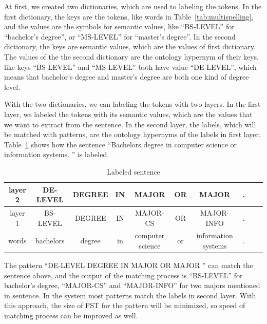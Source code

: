 At first, we created two dictionaries, which are used to labeling the tokens. In the first dictionary, the keys are the tokens, like words in Table~\ref{tab:multispelling}, and the values are the symbols for semantic values, like ``BS-LEVEL'' for ``bachelor's degree'', or ``MS-LEVEL'' for ``master's degree''. In the second dictionary, the keys are semantic values, which are the values of first dictionary. The values of the the second dictionary are the ontology hypernym of their keys, like keys ``BS-LEVEL'' and  ``MS-LEVEL'' both have value ``DE-LEVEL'', which means that bachelor's degree and master's degree are both one kind of degree level.

With the two dictionaries, we can labeling the tokens with two layers. In the first layer, we labeled the tokens with its semantic values, which are the values that we want to extract from the sentence. In the second layer, the labels, which will be matched with patterns, are the ontology hypernyms of the labels in first layer. Table~\ref{tab:labeldsent} shows how the sentence ``Bachelors  degree  in computer science or information systems. '' is labeled.

\begin{table}[ht]
\caption{Labeled sentence } %
\centering %
\small
\begin{tabular}{  | c | c | c | c | c |c | c |c | c | c |  }
 \hline
 layer 2 & DE-LEVEL   & DEGREE & IN & MAJOR            & OR & MAJOR  &.  \\
 \hline
 layer 1 &  BS-LEVEL   & DEGREE & IN & MAJOR-CS         & OR & MAJOR-INFO & .      \\
 \hline
   words & bachelors   & degree & in & computer science & or & information systems & .     \\
  \hline
\end{tabular}
\label{tab:labeldsent} %
\end{table}

The pattern ``DE-LEVEL DEGREE  IN   MAJOR  OR  MAJOR ''  can match the sentence above, and the output of the matching process is ``BS-LEVEL'' for bachelor's degree, ``MAJOR-CS'' and ``MAJOR-INFO'' for two majors mentioned in sentence. In the system most patterns match the labels in second layer. With this approach, the size of FST for the pattern will be minimized, so speed of matching process can be improved as well. 

